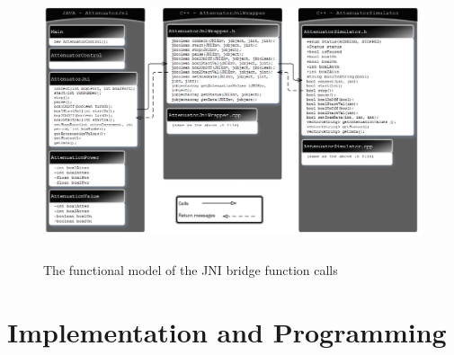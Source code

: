 \documentclass [a4paper,12pt,oneside,final,titlepage]{article}
\begin{document}
	\begin{figure}[htp]
		\centering
		\includegraphics[height=80mm]{Packages}
		\caption{The functional model of the JNI bridge function calls}
		\label{fig:functional}
	\end{figure}

\section{Implementation and Programming}
\end{document}
